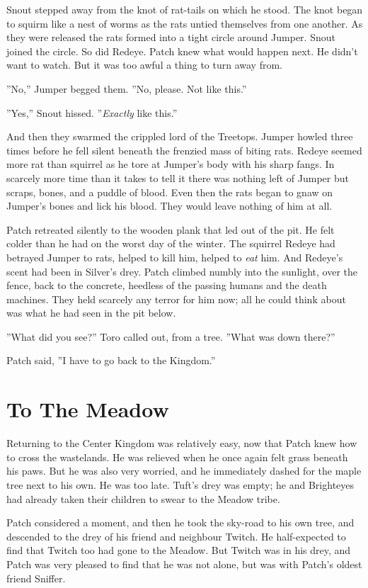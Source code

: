 \documentclass[12pt]{book}
\begin{document}
Snout stepped away from the knot of rat-tails on which he stood. The knot began to squirm like a nest of worms as the rats untied themselves from one another. As they were released the rats formed into a tight circle around Jumper. Snout joined the circle. So did Redeye. Patch knew what would happen next. He didn't want to watch. But it was too awful a thing to turn away from.

''No,'' Jumper begged them. ''No, please. Not like this.''

''Yes,'' Snout hissed. ''{\it Exactly} like this.''

And then they swarmed the crippled lord of the Treetops. Jumper howled three times before he fell silent beneath the frenzied mass of biting rats. Redeye seemed more rat than squirrel as he tore at Jumper's body with his sharp fangs. In scarcely more time than it takes to tell it there was nothing left of Jumper but scraps, bones, and a puddle of blood. Even then the rats began to gnaw on Jumper's bones and lick his blood. They would leave nothing of him at all.

Patch retreated silently to the wooden plank that led out of the pit. He felt colder than he had on the worst day of the winter. The squirrel Redeye had betrayed Jumper to rats, helped to kill him, helped to {\it eat} him. And Redeye's scent had been in Silver's drey. Patch climbed numbly into the sunlight, over the fence, back to the concrete, heedless of the passing humans and the death machines. They held scarcely any terror for him now; all he could think about was what he had seen in the pit below.

''What did you see?'' Toro called out, from a tree. ''What was down there?''

Patch said, ''I have to go back to the Kingdom.''


\section{To The Meadow}

Returning to the Center Kingdom was relatively easy, now that Patch knew how to cross the wastelands. He was relieved when he once again felt grass beneath his paws. But he was also very worried, and he immediately dashed for the maple tree next to his own. He was too late. Tuft's drey was empty; he and Brighteyes had already taken their children to swear to the Meadow tribe.

Patch considered a moment, and then he took the sky-road to his own tree, and descended to the drey of his friend and neighbour Twitch. He half-expected to find that Twitch too had gone to the Meadow. But Twitch was in his drey, and Patch was very pleased to find that he was not alone, but was with Patch's oldest friend Sniffer.
\end{document}
